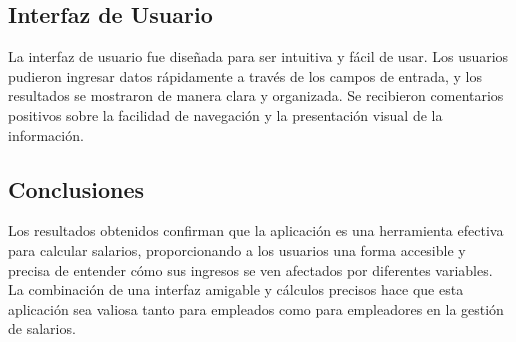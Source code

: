 \documentclass[conference]{IEEEtran}
\begin{document}
\subsection*{Interfaz de Usuario}
La interfaz de usuario fue diseñada para ser intuitiva y fácil de usar. Los usuarios pudieron ingresar datos rápidamente a través de los campos de entrada, y los resultados se mostraron de manera clara y organizada. Se recibieron comentarios positivos sobre la facilidad de navegación y la presentación visual de la información.


\subsection*{Conclusiones}
Los resultados obtenidos confirman que la aplicación es una herramienta efectiva para calcular salarios, proporcionando a los usuarios una forma accesible y precisa de entender cómo sus ingresos se ven afectados por diferentes variables. La combinación de una interfaz amigable y cálculos precisos hace que esta aplicación sea valiosa tanto para empleados como para empleadores en la gestión de salarios.


\printbibliography
\end{document}
